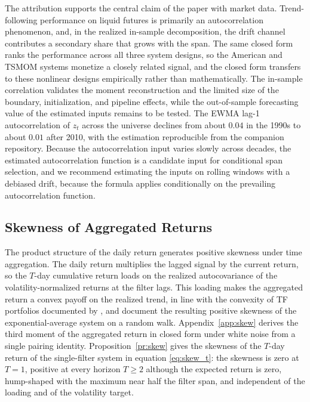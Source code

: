 \documentclass[hidelinks]{siamonline250211}
\begin{document}
The attribution supports the central claim of the paper with market data. Trend-following performance on liquid futures is primarily an autocorrelation phenomenon, and, in the realized in-sample decomposition, the drift channel contributes a secondary share that grows with the span. The same closed form ranks the performance across all three system designs, so the American and TSMOM systems monetize a closely related signal, and the closed form transfers to these nonlinear designs empirically rather than mathematically. The in-sample correlation validates the moment reconstruction and the limited size of the boundary, initialization, and pipeline effects, while the out-of-sample forecasting value of the estimated inputs remains to be tested. The EWMA lag-1 autocorrelation of $z_{t}$ across the universe declines from about $0.04$ in the 1990s to about $0.01$ after 2010, with the estimation reproducible from the companion repository. Because the autocorrelation input varies slowly across decades, the estimated autocorrelation function is a candidate input for conditional span selection, and we recommend estimating the inputs on rolling windows with a debiased drift, because the formula applies conditionally on the prevailing autocorrelation function.


\subsection{Skewness of Aggregated Returns}\label{ssec:skew}

The product structure of the daily return generates positive skewness under time aggregation. The daily return multiplies the lagged signal by the current return, so the $T$-day cumulative return loads on the realized autocovariance of the volatility-normalized returns at the filter lags. This loading makes the aggregated return a convex payoff on the realized trend, in line with the convexity of TF portfolios documented by \cite{Bouchaud2017}, and \cite{Potters2006} document the resulting positive skewness of the exponential-average system on a random walk. Appendix~\ref{app:skew} derives the third moment of the aggregated return in closed form under white noise from a single pairing identity. Proposition~\ref{pr:skew} gives the skewness of the $T$-day return of the single-filter system in equation \eqref{eq:skew_t}: the skewness is zero at $T=1$, positive at every horizon $T\geq 2$ although the expected return is zero, hump-shaped with the maximum near half the filter span, and independent of the loading and of the volatility target.
\end{document}
